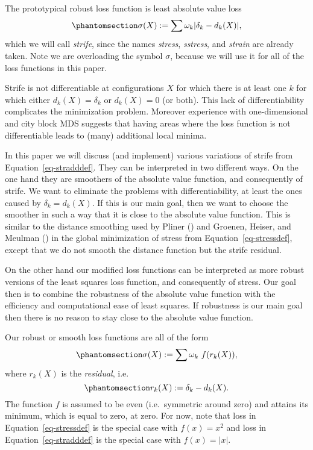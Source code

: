 \documentclass[
  12pt,
  letterpaper,
  DIV=11,
  numbers=noendperiod]{scrartcl}
\theoremstyle{plain}
\theoremstyle{plain}
\theoremstyle{plain}
\theoremstyle{definition}
\theoremstyle{definition}
\theoremstyle{remark}
\begin{document}
The prototypical robust loss function is least absolute value loss
\begin{equation}\phantomsection\label{eq-stradddef}{
\sigma(X):=\sum \omega_k|\delta_k-d_k(X)|,
}\end{equation} which we will call \emph{strife}, since the names
\emph{stress}, \emph{sstress}, and \emph{strain} are already taken. Note
we are overloading the symbol \(\sigma\), because we will use it for all
of the loss functions in this paper.

Strife is not differentiable at configurations \(X\) for which there is
at least one \(k\) for which either \(d_k(X)=\delta_k\) or \(d_k(X)=0\)
(or both). This lack of differentiability complicates the minimization
problem. Moreover experience with one-dimensional and city block MDS
suggests that having areas where the loss function is not differentiable
leads to (many) additional local minima.

In this paper we will discuss (and implement) various variations of
strife from Equation~\ref{eq-stradddef}. They can be interpreted in two
different ways. On the one hand they are smoothers of the absolute value
function, and consequently of strife. We want to eliminate the problems
with differentiability, at least the ones caused by \(\delta_k=d_k(X)\).
If this is our main goal, then we want to choose the smoother in such a
way that it is close to the absolute value function. This is similar to
the distance smoothing used by Pliner ()
and Groenen, Heiser, and Meulman
() in the global
minimization of stress from Equation~\ref{eq-stressdef}, except that we
do not smooth the distance function but the strife residual.

On the other hand our modified loss functions can be interpreted as more
robust versions of the least squares loss function, and consequently of
stress. Our goal then is to combine the robustness of the absolute value
function with the efficiency and computational ease of least squares. If
robustness is our main goal then there is no reason to stay close to the
absolute value function.

Our robust or smooth loss functions are all of the form
\begin{equation}\phantomsection\label{eq-strifedef}{
\sigma(X):=\sum\omega_k\ f(r_k(X)),
}\end{equation} where \(r_k(X)\) is the \emph{residual}, i.e.
\begin{equation}\phantomsection\label{eq-resdef}{
r_k(X):=\delta_k-d_k(X).
}\end{equation} The function \(f\) is assumed to be even (i.e.~symmetric
around zero) and attains its minimum, which is equal to zero, at zero.
For now, note that loss in Equation~\ref{eq-stressdef} is the special
case with \(f(x)=x^2\) and loss in Equation~\ref{eq-stradddef} is the
special case with \(f(x)=|x|\).
\end{document}
